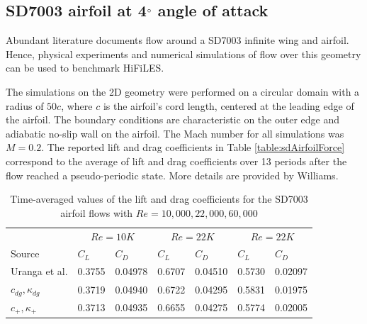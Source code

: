 \graphicspath{{figures_SD7003/}}%

\subsection{SD7003 airfoil at 4$^{\circ}$ angle of attack}\label{sd7003airfoil}

Abundant literature documents flow around a SD7003 infinite wing and airfoil. Hence, physical experiments \cite{ol2005comparison,radespiel2007numerical} and numerical simulations \cite{galbraith2008implicit,visbal2009high,castonguay2010simulation,persson2010high,uranga2011implicit} of flow over this geometry can be used to benchmark HiFiLES.

The simulations on the 2D geometry were performed on a circular domain with a radius of $50c$, where $c$ is the airfoil's cord length, centered at the leading edge of the airfoil. The boundary conditions are characteristic on the outer edge and adiabatic no-slip wall on the airfoil. The Mach number for all simulations was $M = 0.2$. The reported lift and drag coefficients in Table \eqref{table:sdAirfoilForce} correspond to the average of lift and drag coefficients over 13 periods after the flow reached a pseudo-periodic state. More details are provided by Williams\cite{williams2013thesis}. 

\begin{table}[htbp]
\centering
\begin{tabular}{ l| l l| l l| l l} 
  
 &  \multicolumn{2}{|c|}{$Re = 10K$}  & \multicolumn{2}{|c|}{$Re = 22K$} & \multicolumn{2}{|c}{$Re = 22K$}  \\ 
 Source & $C_L$ & $C_D$ & $C_L$ & $C_D$ & $C_L$ & $C_D$   \\ 
\hline
 Uranga et al.\cite{uranga2011implicit} & 0.3755 & 0.04978 & 0.6707 & 0.04510 & 0.5730 & 0.02097  \\ 
$c_{dg},\kappa_{dg}$ & 0.3719 & 0.04940 & 0.6722 & 0.04295 & 0.5831 & 0.01975 \\ 
$c_{+},\kappa_{+}$ & 0.3713 & 0.04935 & 0.6655 & 0.04275 & 0.5774 & 0.02005  \\ 
 \end{tabular}
\caption{Time-averaged values of the lift and drag coefficients for the SD7003 airfoil flows with $Re = 10,000, 22,000, 60,000$}
\label{table:sdAirfoilForce} 
 \end{table}


